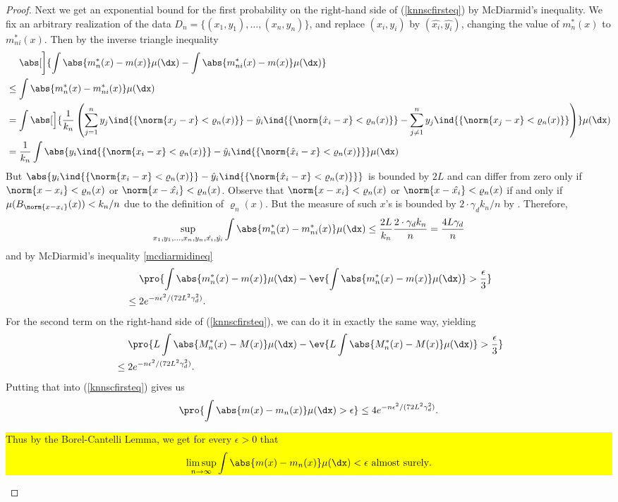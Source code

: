 \begin{proof}
    Next we get an exponential bound for the first probability on the right-hand
    side of (\ref{knnscfirsteq}) by McDiarmid's inequality. We fix an arbitrary realization of the data \(D_n = \{(x_1, y_1), \ldots, (x_n, y_n)\}\), and replace \((x_i, y_i)\) by \((\hat{x_i}, \hat{y_i})\), changing the value of \(m_n^*(x)\) to \(m_{ni}^*(x)\). Then by the inverse triangle inequality
    \begin{align*}
        &\quad \ \abs[\bigg]{\int \abs{m_n^*(x) - m(x)} \mu(\dx) - \int \abs{m_{ni}^*(x) - m(x)} \mu(\dx)} \\
        &\leq \int \abs{m_n^*(x) - m_{ni}^*(x)} \mu(\dx) \\
        &= \int \abs[\Big]{\frac{1}{k_n}\left(\sum_{j = 1}^n y_j \ind{\{\norm{x_j - x} < \varrho_n(x)\}} - \hat{y}_i \ind{\{\norm{\hat{x}_i - x} < \varrho_n(x)\}} - \sum_{j \neq 1}^n y_j \ind{\{\norm{x_j - x} < \varrho_n(x)\}}\right)} \mu(\dx) \\
        &= \frac{1}{k_n} \int \abs{y_i \ind{\{\norm{x_i - x} < \varrho_n(x)\}} - \hat{y}_i \ind{\{\norm{\hat{x}_i - x} < \varrho_n(x)\}}} \mu(\dx)
    \end{align*}
    But \(\abs{y_i \ind{\{\norm{x_i - x} < \varrho_n(x)\}} - \hat{y}_i \ind{\{\norm{\hat{x}_i - x} < \varrho_n(x)\}}}\) is bounded by \(2L\) and can differ from zero only if \(\norm{x - x_i} < \varrho_n(x)\) or \(\norm{x - \hat{x_i}} < \varrho_n(x)\). Observe that \(\norm{x - x_i} < \varrho_n(x)\) or \(\norm{x - \hat{x_i}} < \varrho_n(x)\) if and only if \(\mu(B_{\norm{x - x_i}}(x)) < k_n / n\) due to the definition of \(\varrho_n(x)\). But the measure of such \(x\)'s is bounded by \(2 \cdot \gamma_d k_n / n\) by .
    Therefore,
    \[
        \sup_{x_1, y_1, \ldots, x_n, y_n, \hat{x_i}, \hat{y_i}}
        \int \abs{m_{n}^*(x) - m_{ni}^*(x)} \mu(\dx)
        \leq \frac{2L}{k_n} \frac{2 \cdot \gamma_d k_n}{n} = \frac{4L \gamma_d}{n}
    \]
    and by McDiarmid's inequality \ref{mcdiarmidineq}
    \begin{align*}
        &\quad \ \pro{\int \abs{m_n^*(x) - m(x)} \mu(\dx) - \ev{\int \abs{m_n^*(x) - m(x)} \mu(\dx)}  > \frac{\epsilon}{3}} \\
        &\leq 2e^{-n\epsilon^2 / (72L^2 \gamma_d^2)}.
    \end{align*}
    For the second term on the right-hand side of (\ref{knnscfirsteq}), we can do it in exactly the same way, yielding
    \begin{align*}
        &\quad \ \pro{L\int \abs{M_n^*(x) - M(x)} \mu(\dx) - \ev{L\int \abs{M_n^*(x) - M(x)} \mu(\dx)}  > \frac{\epsilon}{3}} \\
        &\leq 2e^{-n\epsilon^2 / (72L^2 \gamma_d^2)}.
    \end{align*}
    Putting that into (\ref{knnscfirsteq}) gives us
    \[
        \pro{\int \abs{m(x) - m_n(x)} \mu(\dx) > \epsilon}
        \leq 4e^{-n\epsilon^2 / (72 L^2 \gamma^2_d)}.
    \]
    \colorbox{yellow}{\parbox{10cm}{
    Thus by the Borel-Cantelli Lemma, we get for every \(\epsilon > 0\) that
    \[
        \limsup_{n \to \infty} \int \abs{m(x) - m_n(x)} \mu(\dx) < \epsilon \ \text{almost surely}.
    \]}}
   

\end{proof}
